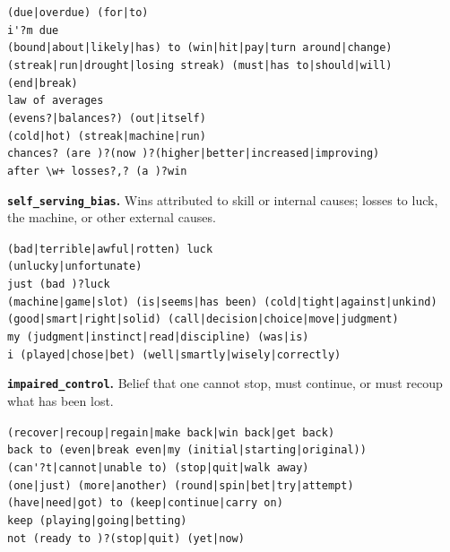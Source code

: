 \begin{flushleft}\small
\verb+(due|overdue) (for|to)+\\
\verb+i'?m due+\\
\verb+(bound|about|likely|has) to (win|hit|pay|turn around|change)+\\
\verb+(streak|run|drought|losing streak) (must|has to|should|will) (end|break)+\\
\verb+law of averages+\\
\verb+(evens?|balances?) (out|itself)+\\
\verb+(cold|hot) (streak|machine|run)+\\
\verb+chances? (are )?(now )?(higher|better|increased|improving)+\\
\verb!after \w+ losses?,? (a )?win!
\end{flushleft}

\vspace{0.5em}
\noindent\textbf{\texttt{self\_serving\_bias}.} Wins attributed to skill or internal causes;
losses to luck, the machine, or other external causes.

\begin{flushleft}\small
\verb+(bad|terrible|awful|rotten) luck+\\
\verb+(unlucky|unfortunate)+\\
\verb+just (bad )?luck+\\
\verb+(machine|game|slot) (is|seems|has been) (cold|tight|against|unkind)+\\
\verb+(good|smart|right|solid) (call|decision|choice|move|judgment)+\\
\verb+my (judgment|instinct|read|discipline) (was|is)+\\
\verb+i (played|chose|bet) (well|smartly|wisely|correctly)+
\end{flushleft}

\vspace{0.5em}
\noindent\textbf{\texttt{impaired\_control}.} Belief that one cannot stop, must continue, or must
recoup what has been lost.

\begin{flushleft}\small
\verb+(recover|recoup|regain|make back|win back|get back)+\\
\verb+back to (even|break even|my (initial|starting|original))+\\
\verb+(can'?t|cannot|unable to) (stop|quit|walk away)+\\
\verb+(one|just) (more|another) (round|spin|bet|try|attempt)+\\
\verb+(have|need|got) to (keep|continue|carry on)+\\
\verb+keep (playing|going|betting)+\\
\verb+not (ready to )?(stop|quit) (yet|now)+
\end{flushleft}

